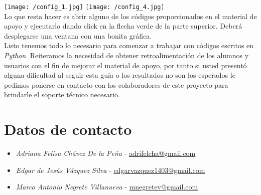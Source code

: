\documentclass[a4paper, openright, 12pt]{article}
\begin{document}
      \texttt{[image: /config\_1.jpg]}
      \texttt{[image: /config\_4.jpg]}\\

      Lo que resta hacer es abrir alguno de los códigos proporcionados en el material de apoyo y ejecutarlo dando click en la flecha verde de la parte superior. Deberá desplegarse una ventana con una bonita gráfica.\\

      Listo tenemos todo lo necesario para comenzar a trabajar con códigos escritos en \textit{Python}. Reiteramos la necesidad de obtener retroalimentación de los alumnos y usuarios con el fin de mejorar el material de apoyo, por tanto si usted presentó alguna dificultad al seguir esta guía o los resultados no son los esperados le pedimos ponerse en contacto con los colaboradores de este proyecto para brindarle el soporte técnico necesario.
  \newpage{}


  \section*{Datos de contacto}
    \begin{itemize}
      \doublespacing
      \item{\textit{Adriana Felisa Chávez De la Peña} - \url{ adrifelcha@gmail.com} }
      \item{\textit{Edgar de Jesús Vázquez Silva} - \url{edgarvazquez1403@gmail.com} }
      \item{\textit{Marco Antonio Negrete Villanueva} - \url{mnegretev@gmail.com} }
    \end{itemize}
\end{document}
